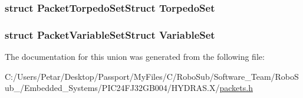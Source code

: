 \subsubsection[{Torpedo\+Set}]{\setlength{\rightskip}{0pt plus 5cm}struct {\bf Packet\+Torpedo\+Set\+Struct} Torpedo\+Set}\label{union_packet_union_a4152a82cdb15d94a2cd3835c3c543019}
\hypertarget{union_packet_union_a02290ae7707dc7a42bec0fb64ccd736d}{}
\subsubsection[{Variable\+Set}]{\setlength{\rightskip}{0pt plus 5cm}struct {\bf Packet\+Variable\+Set\+Struct} Variable\+Set}\label{union_packet_union_a02290ae7707dc7a42bec0fb64ccd736d}


The documentation for this union was generated from the following file\+:\begin{DoxyCompactItemize}
\item 
C\+:/\+Users/\+Petar/\+Desktop/\+Passport/\+My\+Files/\+C/\+Robo\+Sub/\+Software\+\_\+\+Team/\+Robo\+Sub\+\_/\+Embedded\+\_\+\+Systems/\+P\+I\+C24\+F\+J32\+G\+B004/\+H\+Y\+D\+R\+A\+S.\+X/\hyperlink{_h_y_d_r_a_s_8_x_2packets_8h}{packets.\+h}\end{DoxyCompactItemize}
